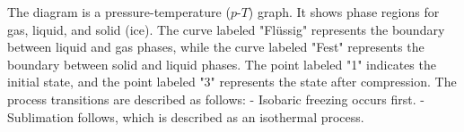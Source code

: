 The diagram is a pressure-temperature (\( p \)-\( T \)) graph. It shows phase regions for gas, liquid, and solid (ice). The curve labeled "Flüssig" represents the boundary between liquid and gas phases, while the curve labeled "Fest" represents the boundary between solid and liquid phases. The point labeled "1" indicates the initial state, and the point labeled "3" represents the state after compression. The process transitions are described as follows:  
- Isobaric freezing occurs first.  
- Sublimation follows, which is described as an isothermal process.